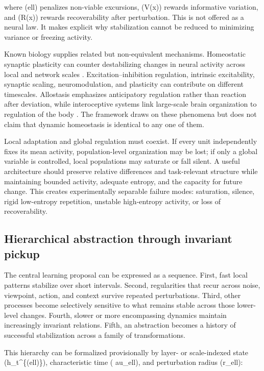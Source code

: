 \documentclass[
  11pt,
  a4paper,
]{article}
\begin{document}
where (ell) penalizes non-viable excursions, (V(x)) rewards informative
variation, and (R(x)) rewards recoverability after perturbation. This is
not offered as a neural law. It makes explicit why stabilization cannot
be reduced to minimizing variance or freezing activity.

Known biology supplies related but non-equivalent mechanisms.
Homeostatic synaptic plasticity can counter destabilizing changes in
neural activity across local and network scales \citep{turrigiano2012}.
Excitation--inhibition regulation, intrinsic excitability, synaptic
scaling, neuromodulation, and plasticity can contribute on different
timescales. Allostasis emphasizes anticipatory regulation rather than
reaction after deviation, while interoceptive systems link large-scale
brain organization to regulation of the body
\citep{kleckner2017, tschantz2022}. The framework draws on these
phenomena but does not claim that dynamic homeostasis is identical to
any one of them.

Local adaptation and global regulation must coexist. If every unit
independently fixes its mean activity, population-level organization may
be lost; if only a global variable is controlled, local populations may
saturate or fall silent. A useful architecture should preserve relative
differences and task-relevant structure while maintaining bounded
activity, adequate entropy, and the capacity for future change. This
creates experimentally separable failure modes: saturation, silence,
rigid low-entropy repetition, unstable high-entropy activity, or loss of
recoverability.

\subsection{Hierarchical abstraction through invariant
pickup}\label{hierarchical-abstraction-through-invariant-pickup}

The central learning proposal can be expressed as a sequence. First,
fast local patterns stabilize over short intervals. Second, regularities
that recur across noise, viewpoint, action, and context survive repeated
perturbations. Third, other processes become selectively sensitive to
what remains stable across those lower-level changes. Fourth, slower or
more encompassing dynamics maintain increasingly invariant relations.
Fifth, an abstraction becomes a history of successful stabilization
across a family of transformations.

This hierarchy can be formalized provisionally by layer- or
scale-indexed state (h\_t\^{}\{(ell)\}), characteristic time ( au\_ell),
and perturbation radius (r\_ell):
\end{document}

